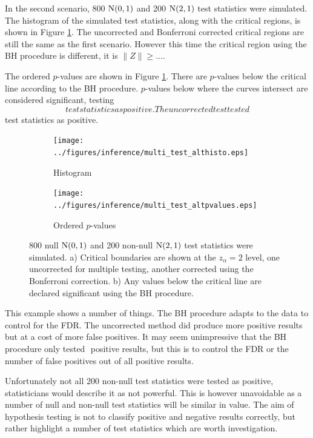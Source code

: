 In the second scenario, 800 $\operatorname{N}(0,1)$ and 200 $\operatorname{N}(2,1)$ test statistics were simulated. The histogram of the simulated test statistics, along with the critical regions, is shown in Figure \ref{fig:inference_multi_test_althisto_pvalues}. The uncorrected and Bonferroni corrected critical regions are still the same as the first scenario. However this time the critical region using the BH procedure is different, it is $\|Z\|\geqslant...$.

The ordered $p$-values are shown in Figure \ref{fig:inference_multi_test_althisto_pvalues}. There are $p$-values below the critical line according to the BH procedure. $p$-values below where the curves intersect are considered significant, testing $$ test statistics as positive. The uncorrected test tested $$ test statistics as positive.

\begin{figure}
    \centering
    \begin{subfigure}[b]{0.8\textwidth}
    	\texttt{[image: ../figures/inference/multi\_test\_althisto.eps]}
    	\caption{Histogram}
    \end{subfigure}
	\begin{subfigure}[b]{0.8\textwidth}
    	\texttt{[image: ../figures/inference/multi\_test\_altpvalues.eps]}
    	\caption{Ordered $p$-values}
    \end{subfigure}
    \caption{800 null $\operatorname{N}(0,1)$ and 200 non-null $\operatorname{N}(2,1)$ test statistics were simulated. a) Critical boundaries are shown at the $z_\alpha=2$ level, one uncorrected for multiple testing, another corrected using the Bonferroni correction. b) Any values below the critical line are declared significant using the BH procedure.}
    \label{fig:inference_multi_test_althisto_pvalues}
\end{figure}

This example shows a number of things. The BH procedure adapts to the data to control for the FDR. The uncorrected method did produce more positive results but at a cost of more false positives. It may seem unimpressive that the BH procedure only tested $$ positive results, but this is to control the FDR or the number of false positives out of all positive results.

Unfortunately not all 200 non-null test statistics were tested as positive, statisticians would describe it as not powerful. This is however unavoidable as a number of null and non-null test statistics will be similar in value. The aim of hypothesis testing is not to classify positive and negative results correctly, but rather highlight a number of test statistics which are worth investigation.

